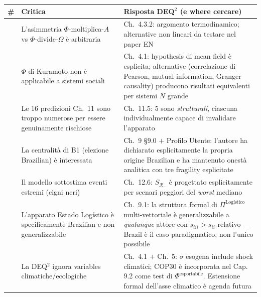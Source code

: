 {\def\LTcaptype{none} %
{\small\begin{longtable}[]{@{}
  >{\raggedright\arraybackslash}p{}
  >{\raggedright\arraybackslash}p{}
  >{\raggedright\arraybackslash}p{}@{}}
\toprule\noalign{}
\begin{minipage}[b]{\linewidth}\raggedright
\#
\end{minipage} & \begin{minipage}[b]{\linewidth}\raggedright
Critica
\end{minipage} & \begin{minipage}[b]{\linewidth}\raggedright
Risposta DEQ$^2$ (e where cercare)
\end{minipage} \\
\midrule\noalign{}
\endhead
\bottomrule\noalign{}
\endlastfoot
1 & L'asimmetria \(\Phi\)-moltiplica-\(A\) vs \(\Phi\)-divide-\(\Omega\)
è arbitraria & Ch.~4.3.2: argomento termodinamico; alternative non
lineari da testare nel paper EN \\
2 & \(\Phi\) di Kuramoto non è applicabile a sistemi sociali & Ch.~4.1:
hypothesis di mean field è esplicita; alternative (correlazione di
Pearson, mutual information, Granger causality) producono risultati
equivalenti per sistemi \(N\) grande \\
3 & Le 16 predizioni Ch.~11 sono troppo numerose per essere
genuinamente rischiose & Ch.~11.5: 5 sono \emph{strutturali}, ciascuna
individualmente capace di invalidare l'apparato \\
4 & La centralità di B1 (elezione Brazilian) è interessata & Ch.~9
\S{}9.0 + Profilo Utente: l'autore ha dichiarato esplicitamente la propria
origine Brazilian e ha mantenuto onestà analitica con tre fragility
esplicitate \\
5 & Il modello sottostima eventi estremi (cigni neri) & Ch.~12.6:
\(S_{\mathcal{R}_-}\) è progettato esplicitamente per scenari peggiori
del \emph{worst} mediano \\
6 & L'apparato Estado Logístico è specificamente Brazilian e non
generalizzabile & Ch.~9.1: la struttura formal di
\(\Pi^{\text{Logístico}}\) multi-vettoriale è generalizzabile a
\emph{qualunque} attore con \(s_{iii} > s_{ii}\) relativo --- Brazil è
il caso paradigmatico, non l'unico possibile \\
7 & La DEQ$^2$ ignora variables climatiche/ecologiche & Ch.~4.1 + Ch.~5:
\(\sigma\) esogena include shock climatici; COP30 è incorporata nel Cap.
9.2 come test di \(\Phi^{\text{esportabile}}\). Estensione formal
dell'asse climatico è agenda futura \\
\end{longtable}}
}

